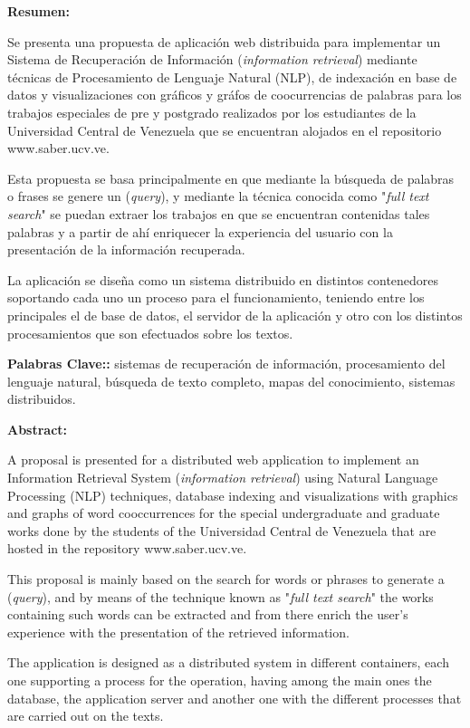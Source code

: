 \documentclass[
  10,
  openany]{book}
\begin{document}
\newpage
\thispagestyle{empty}
\large{\textbf{Resumen:}}

Se presenta una propuesta de aplicación web distribuida para implementar un Sistema de Recuperación de Información (\emph{information retrieval}) mediante técnicas de Procesamiento de Lenguaje Natural (NLP), de indexación en base de datos y visualizaciones con gráficos y gráfos de coocurrencias de palabras para los trabajos especiales de pre y postgrado realizados por los estudiantes de la Universidad Central de Venezuela que se encuentran alojados en el repositorio www.saber.ucv.ve.

Esta propuesta se basa principalmente en que mediante la búsqueda de palabras o frases se genere un (\emph{query}), y mediante la técnica conocida como "\emph{full text search}" se puedan extraer los trabajos en que se encuentran contenidas tales palabras y a partir de ahí enriquecer la experiencia del usuario con la presentación de la información recuperada.

La aplicación se diseña como un sistema distribuido en distintos contenedores soportando cada uno un proceso para el funcionamiento, teniendo entre los principales el de base de datos, el servidor de la aplicación y otro con los distintos procesamientos que son efectuados sobre los textos.

\textbf{Palabras Clave::} sistemas de recuperación de información, procesamiento del lenguaje natural, búsqueda de texto completo, mapas del conocimiento, sistemas distribuidos.

\vspace*{2cm}

\large{\textbf{Abstract:}}

A proposal is presented for a distributed web application to implement an Information Retrieval System (\emph{information retrieval}) using Natural Language Processing (NLP) techniques, database indexing and visualizations with graphics and graphs of word cooccurrences for the special undergraduate and graduate works done by the students of the Universidad Central de Venezuela that are hosted in the repository www.saber.ucv.ve.

This proposal is mainly based on the search for words or phrases to generate a (\emph{query}), and by means of the technique known as "\emph{full text search}" the works containing such words can be extracted and from there enrich the user's experience with the presentation of the retrieved information.

The application is designed as a distributed system in different containers, each one supporting a process for the operation, having among the main ones the database, the application server and another one with the different processes that are carried out on the texts.
\end{document}
